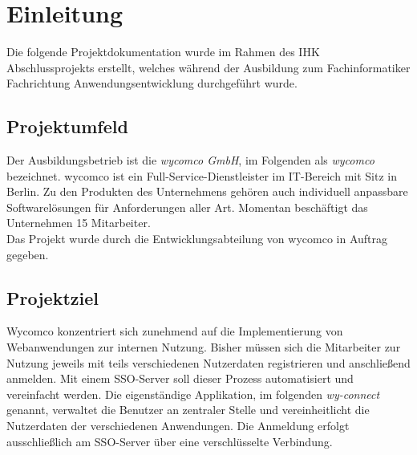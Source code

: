 \section{Einleitung}
\label{sec:Einleitung}
Die folgende Projektdokumentation wurde im Rahmen des IHK Abschlussprojekts erstellt, welches während der Ausbildung zum Fachinformatiker Fachrichtung Anwendungsentwicklung durchgeführt wurde.
\subsection{Projektumfeld} 
\label{sec:Projektumfeld}
Der Ausbildungsbetrieb ist die \textit{wycomco GmbH}, im Folgenden als \textit{wycomco} bezeichnet. wycomco ist ein Full-Service-Dienstleister im IT-Bereich mit Sitz in Berlin. Zu den Produkten des Unternehmens gehören auch individuell anpassbare Softwarelösungen für Anforderungen aller Art. Momentan beschäftigt das Unternehmen 15 Mitarbeiter. \\
Das Projekt wurde durch die Entwicklungsabteilung von wycomco in Auftrag gegeben. 
\subsection{Projektziel} 
\label{sec:Projektziel}
Wycomco konzentriert sich zunehmend auf die Implementierung von Webanwendungen zur internen Nutzung. Bisher müssen sich die Mitarbeiter zur Nutzung jeweils mit teils verschiedenen Nutzerdaten registrieren und anschließend anmelden.
Mit einem \ac{SSO}-Server soll dieser Prozess automatisiert und vereinfacht werden. Die eigenständige Applikation, im folgenden \textit{wy-connect} genannt, verwaltet die Benutzer an zentraler Stelle und vereinheitlicht die Nutzerdaten der verschiedenen Anwendungen. Die Anmeldung erfolgt ausschließlich am \ac{SSO}-Server über eine verschlüsselte Verbindung.
